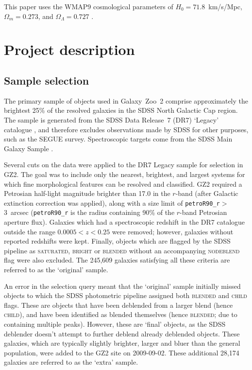 \documentclass[useAMS,usenatbib]{mn2e}
\begin{document}
This paper uses the WMAP9 cosmological parameters of $H_0=71.8$~km/s/Mpc, $\Omega_m = 0.273$, and $\Omega_\Lambda = 0.727$ \citep{hin12}. 


\section{Project description} \label{sec-description}

\subsection{Sample selection} \label{ssec-sample}
The primary sample of objects used in Galaxy~Zoo~2 comprise approximately the brightest 25\% of the resolved galaxies in the SDSS North Galactic Cap region. The sample is generated from the SDSS Data Release~7 (DR7) `Legacy' catalogue \citep{aba09}, and therefore excludes observations made by SDSS for other purposes, such as the SEGUE survey. Spectroscopic targets come from the SDSS Main Galaxy Sample \citep{str02}.

Several cuts on the data were applied to the DR7 Legacy sample for selection in GZ2. The goal was to include only the nearest, brightest, and largest systems for which fine morphological features can be resolved and classified. GZ2 required a Petrosian half-light magnitude brighter than 17.0 in the $r$-band (after Galactic extinction correction was applied), along with a size limit of {\tt petroR90\_r}$>$3~arcsec ({\tt petroR90\_r} is the radius containing 90\% of the $r$-band Petrosian aperture flux). Galaxies which had a spectroscopic redshift in the DR7 catalogue outside the range $0.0005<z<0.25$ were removed; however, galaxies without reported redshifts were kept. Finally, objects which are flagged by the SDSS pipeline as \textsc{saturated}, \textsc{bright} or \textsc{blended} without an accompanying \textsc{nodeblend} flag were also excluded. The 245,609 galaxies satisfying all these criteria are referred to as the `original' sample.  

An error in the selection query meant that the `original' sample initially missed objects to which the SDSS photometric pipeline \citep{sto02} assigned both \textsc{blended} and \textsc{child} flags. These are objects that have been deblended from a larger blend (hence \textsc{child}), and have been identified as blended themselves (hence \textsc{blended}; due to containing multiple peaks). However, these are `final' objects, as the SDSS deblender doesn't attempt to further deblend already deblended objects.  These galaxies, which are typically slightly brighter, larger and bluer than the general population, were added to the GZ2 site on 2009-09-02. These additional 28,174 galaxies are referred to as the `extra' sample. 
\end{document}

